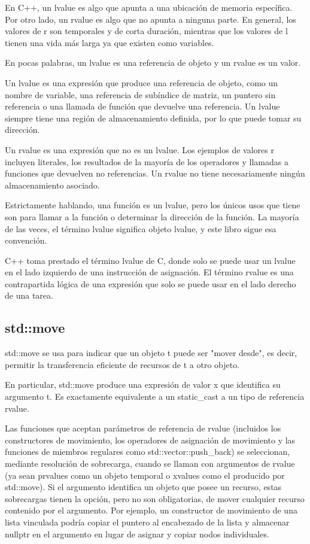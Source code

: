\documentclass[10pt]{article}
\begin{document}
	En C++, un lvalue es algo que apunta a una ubicación de memoria específica. Por otro lado, un rvalue es algo que no apunta a ninguna parte. En general, los valores de r son temporales y de corta duración, mientras que los valores de l tienen una vida más larga ya que existen como variables.
	
	En pocas palabras, un lvalue es una referencia de objeto y un rvalue es un valor. 
	
	Un lvalue es una expresión que produce una referencia de objeto, como un nombre de variable, una referencia de subíndice de matriz, un puntero sin referencia o una llamada de función que devuelve una referencia. Un lvalue siempre tiene una región de almacenamiento definida, por lo que puede tomar su dirección.
	
	Un rvalue es una expresión que no es un lvalue. Los ejemplos de valores r incluyen literales, los resultados de la mayoría de los operadores y llamadas a funciones que devuelven no referencias. Un rvalue no tiene necesariamente ningún almacenamiento asociado.
	
	Estrictamente hablando, una función es un lvalue, pero los únicos usos que tiene son para llamar a la función o determinar la dirección de la función. La mayoría de las veces, el término lvalue significa objeto lvalue, y este libro sigue esa convención.
	
	C++ toma prestado el término lvalue de C, donde solo se puede usar un lvalue en el lado izquierdo de una instrucción de asignación. El término rvalue es una contrapartida lógica de una expresión que solo se puede usar en el lado derecho de una tarea.

\subsection{std::move}
	std::move se usa para indicar que un objeto t puede ser "mover desde", es decir, permitir la transferencia eficiente de recursos de t a otro objeto.
	
	En particular, std::move produce una expresión de valor x que identifica su argumento t. Es exactamente equivalente a un static\_cast a un tipo de referencia rvalue.
	
	Las funciones que aceptan parámetros de referencia de rvalue (incluidos los constructores de movimiento, los operadores de asignación de movimiento y las funciones de miembros regulares como std::vector::push\_back) se seleccionan, mediante resolución de sobrecarga, cuando se llaman con argumentos de rvalue (ya sean prvalues como un objeto temporal o xvalues como el producido por std::move). Si el argumento identifica un objeto que posee un recurso, estas sobrecargas tienen la opción, pero no son obligatorias, de mover cualquier recurso contenido por el argumento. Por ejemplo, un constructor de movimiento de una lista vinculada podría copiar el puntero al encabezado de la lista y almacenar nullptr en el argumento en lugar de asignar y copiar nodos individuales.
	
\end{document}
